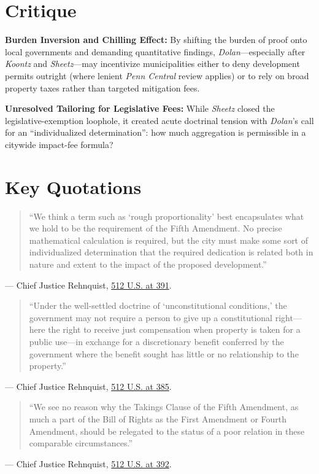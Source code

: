 \documentclass[12pt]{article}
\begin{document}
\section{Critique}
\textbf{Burden Inversion and Chilling Effect:} By shifting the burden of proof onto local governments and demanding quantitative findings, \emph{Dolan}---especially after \emph{Koontz} and \emph{Sheetz}---may incentivize municipalities either to deny development permits outright (where lenient \emph{Penn Central} review applies) or to rely on broad property taxes rather than targeted mitigation fees.

\textbf{Unresolved Tailoring for Legislative Fees:} While \emph{Sheetz} closed the legislative-exemption loophole, it created acute doctrinal tension with \emph{Dolan}'s call for an ``individualized determination'': how much aggregation is permissible in a citywide impact-fee formula?

\section{Key Quotations}
\begin{quote}
``We think a term such as `rough proportionality' best encapsulates what we hold to be the requirement of the Fifth Amendment. No precise mathematical calculation is required, but the city must make some sort of individualized determination that the required dedication is related both in nature and extent to the impact of the proposed development.''
\end{quote}
\noindent --- Chief Justice Rehnquist, \href{https://supreme.justia.com/cases/federal/us/512/374/}{512 U.S. at 391}.

\begin{quote}
``Under the well-settled doctrine of `unconstitutional conditions,' the government may not require a person to give up a constitutional right---here the right to receive just compensation when property is taken for a public use---in exchange for a discretionary benefit conferred by the government where the benefit sought has little or no relationship to the property.''
\end{quote}
\noindent --- Chief Justice Rehnquist, \href{https://supreme.justia.com/cases/federal/us/512/374/}{512 U.S. at 385}.

\begin{quote}
``We see no reason why the Takings Clause of the Fifth Amendment, as much a part of the Bill of Rights as the First Amendment or Fourth Amendment, should be relegated to the status of a poor relation in these comparable circumstances.''
\end{quote}
\noindent --- Chief Justice Rehnquist, \href{https://supreme.justia.com/cases/federal/us/512/374/}{512 U.S. at 392}.
\end{document}
